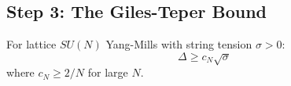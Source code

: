 \subsection{Step 3: The Giles-Teper Bound}

\begin{theorem}
\label{thm:giles-teper-geometric}
For lattice $SU(N)$ Yang-Mills with string tension $\sigma > 0$:
\begin{equation}
\Delta \geq c_N \sqrt{\sigma}
\end{equation}
where $c_N \geq 2/N$ for large $N$.
\end{theorem}

